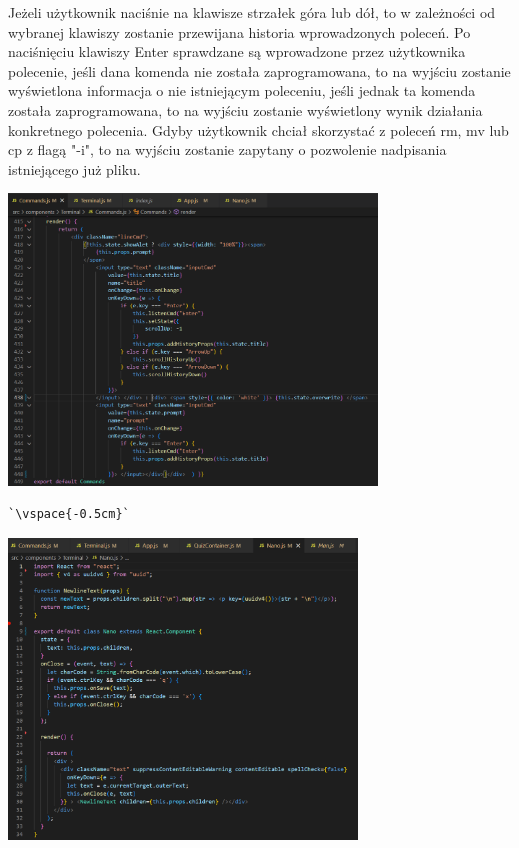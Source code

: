 \documentclass[10pt,a4paper]{report}
\begin{document}
\begin{adjustwidth}{2cm}{2cm}
\begin{minipage}{1\linewidth}
Jeżeli użytkownik naciśnie na klawisze strzałek góra lub dół, to w zależności od wybranej klawiszy zostanie przewijana historia wprowadzonych poleceń. Po naciśnięciu klawiszy Enter sprawdzane są wprowadzone przez użytkownika polecenie, jeśli dana komenda nie została zaprogramowana, to na wyjściu zostanie wyświetlona informacja o nie istniejącym poleceniu, jeśli jednak ta komenda została zaprogramowana, to na wyjściu zostanie wyświetlony wynik działania konkretnego polecenia. Gdyby użytkownik chciał skorzystać z poleceń rm, mv lub cp z flagą "-i", to na wyjściu zostanie zapytany o pozwolenie nadpisania istniejącego już pliku.
\end{minipage}
\begin{center}
\includegraphics[width=370px]{code/command.png}
\begin{lstlisting}[escapeinside=``,caption={Renderowanie w komponencie Commands}]
`\vspace{-0.5cm}`
\end{lstlisting}
\end{center}
\vspace{0.1cm}
\begin{center}
\includegraphics[width=350px]{code/nano.png} 

\end{center}
\end{adjustwidth}
\end{document}
